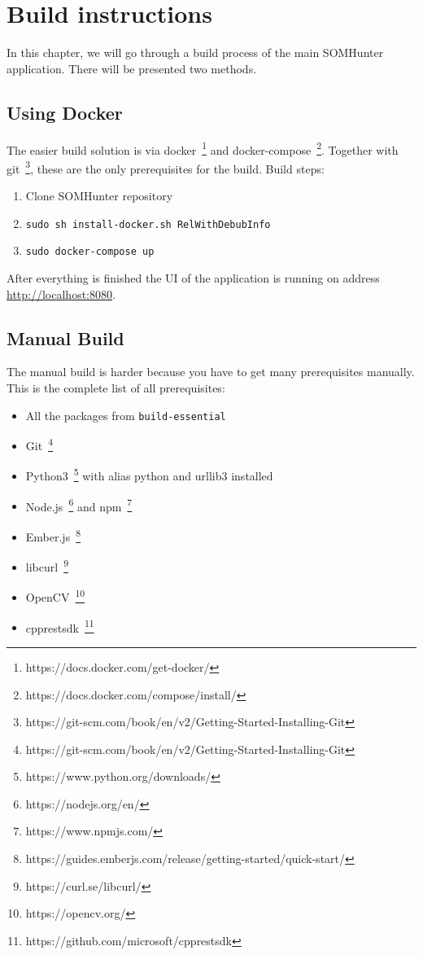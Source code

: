 \chapter{Build instructions}
\label{build}

In this chapter, we will go through a build process of the main SOMHunter application. There will be presented two methods.

\section{Using Docker}

The easier build solution is via docker~\footnote{https://docs.docker.com/get-docker/} and docker-compose~\footnote{https://docs.docker.com/compose/install/}. Together with git~\footnote{https://git-scm.com/book/en/v2/Getting-Started-Installing-Git}, these are the only prerequisites for the build. Build steps:

\begin{enumerate}
  \item Clone SOMHunter repository
  \item \lstinline{sudo sh install-docker.sh RelWithDebubInfo}
  \item \lstinline{sudo docker-compose up}
\end{enumerate}

After everything is finished the UI of the application is running on address \url{http://localhost:8080}.

\section{Manual Build}

The manual build is harder because you have to get many prerequisites manually. This is the complete list of all prerequisites:

\begin{itemize}
  \item All the packages from \lstinline{build-essential}
  \item Git~\footnote{https://git-scm.com/book/en/v2/Getting-Started-Installing-Git}
  \item Python3~\footnote{https://www.python.org/downloads/} with alias python and urllib3 installed
  \item Node.js~\footnote{https://nodejs.org/en/} and npm~\footnote{https://www.npmjs.com/}
  \item Ember.js~\footnote{https://guides.emberjs.com/release/getting-started/quick-start/}
  \item libcurl~\footnote{https://curl.se/libcurl/}
  \item OpenCV~\footnote{https://opencv.org/}
  \item cpprestsdk~\footnote{https://github.com/microsoft/cpprestsdk}
\end{itemize}

